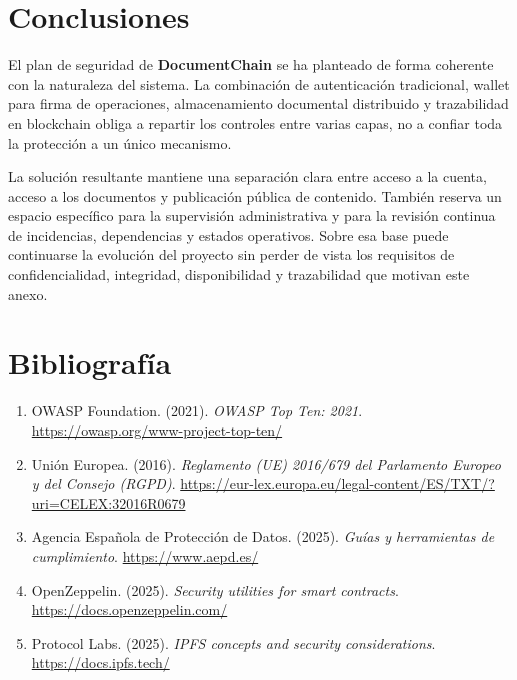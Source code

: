 \documentclass[11pt, a4paper]{article}
\begin{document}
\section{Conclusiones}

El plan de seguridad de \textbf{DocumentChain} se ha planteado de forma coherente con la naturaleza del sistema. La combinación de autenticación tradicional, wallet para firma de operaciones, almacenamiento documental distribuido y trazabilidad en blockchain obliga a repartir los controles entre varias capas, no a confiar toda la protección a un único mecanismo.

La solución resultante mantiene una separación clara entre acceso a la cuenta, acceso a los documentos y publicación pública de contenido. También reserva un espacio específico para la supervisión administrativa y para la revisión continua de incidencias, dependencias y estados operativos. Sobre esa base puede continuarse la evolución del proyecto sin perder de vista los requisitos de confidencialidad, integridad, disponibilidad y trazabilidad que motivan este anexo.

\section*{Bibliografía}

\begin{enumerate}
    \item OWASP Foundation. (2021). \textit{OWASP Top Ten: 2021}. \url{https://owasp.org/www-project-top-ten/}
    \item Unión Europea. (2016). \textit{Reglamento (UE) 2016/679 del Parlamento Europeo y del Consejo (RGPD)}. \url{https://eur-lex.europa.eu/legal-content/ES/TXT/?uri=CELEX:32016R0679}
    \item Agencia Española de Protección de Datos. (2025). \textit{Guías y herramientas de cumplimiento}. \url{https://www.aepd.es/}
    \item OpenZeppelin. (2025). \textit{Security utilities for smart contracts}. \url{https://docs.openzeppelin.com/}
    \item Protocol Labs. (2025). \textit{IPFS concepts and security considerations}. \url{https://docs.ipfs.tech/}
\end{enumerate}
\end{document}
